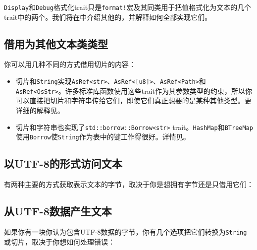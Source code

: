\texttt{Display}和\texttt{Debug}格式化trait只是\texttt{format!}宏及其同类用于把值格式化为文本的几个trait中的两个。我们将在中介绍其他的，并解释如何全部实现它们。

\subsection{借用为其他文本类类型}

你可以用几种不同的方式借用切片的内容：

\begin{itemize}
    \item 切片和\texttt{String}实现\texttt{AsRef<str>}、\texttt{AsRef<[u8]>}、\texttt{AsRef<Path>}和\texttt{AsRef<OsStr>}。许多标准库函数使用这些trait作为其参数类型的约束，所以你可以直接把切片和字符串传给它们，即使它们真正想要的是某种其他类型。更详细的解释见。
    \item 切片和字符串也实现了\texttt{std::borrow::Borrow<str>} trait。\texttt{HashMap}和\texttt{BTreeMap}使用\texttt{Borrow}使\texttt{String}作为表中的键工作得很好。详情见。
\end{itemize}

\subsection{以UTF-8的形式访问文本}

有两种主要的方式获取表示文本的字节，取决于你是想拥有字节还是只借用它们：



\subsection{从UTF-8数据产生文本}

如果你有一块你认为包含UTF-8数据的字节，你有几个选项把它们转换为\texttt{String}或切片，取决于你想如何处理错误：


